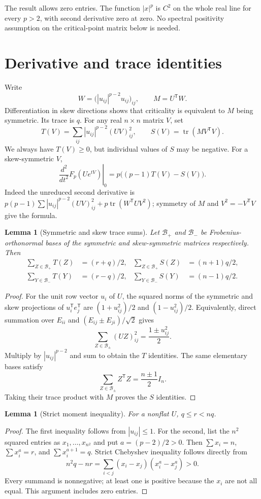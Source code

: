 \documentclass[11pt]{article}
\newtheorem{lemma}[theorem]{Lemma}
\newcommand{\tr}{\operatorname{tr}}
\begin{document}
The result allows zero entries. The function $|x|^p$ is $C^2$ on the
whole real line for every $p>2$, with second derivative zero at zero.
No spectral positivity assumption on the critical-point matrix below
is needed.

\section{Derivative and trace identities}
Write
\[
 W=\bigl(|u_{ij}|^{p-2}u_{ij}\bigr)_{ij},\qquad M=U^{\mathsf T}W.
\]
Differentiation in skew directions shows that criticality is equivalent
to $M$ being symmetric. Its trace is $q$.
For any real $n\times n$ matrix $V$, set
\[
 T(V)=\sum_{ij}|u_{ij}|^{p-2}(UV)_{ij}^2,\qquad
 S(V)=\tr(M V^{\mathsf T}V).
\]
We always have $T(V)\ge0$, but individual values of $S$ may be negative.
For a skew-symmetric $V$,
\begin{equation}\label{eq:hessian}
 \left.\frac{d^2}{dt^2}F_p(Ue^{tV})\right|_0
 =p\bigl((p-1)T(V)-S(V)\bigr).
\end{equation}
Indeed the unreduced second derivative is
$p(p-1)\sum |u_{ij}|^{p-2}(UV)_{ij}^2+
p\tr(W^{\mathsf T}UV^2)$; symmetry of $M$ and
$V^2=-V^{\mathsf T}V$ give the formula.

\begin{lemma}[Symmetric and skew trace sums]\label{lem:traces}
Let $\mathcal B_+$ and $\mathcal B_-$ be Frobenius-orthonormal bases
of the symmetric and skew-symmetric matrices respectively. Then
\begin{align*}
 \sum_{Z\in\mathcal B_+}T(Z)&=(r+q)/2,&
 \sum_{Z\in\mathcal B_+}S(Z)&=(n+1)q/2,\\
 \sum_{Y\in\mathcal B_-}T(Y)&=(r-q)/2,&
 \sum_{Y\in\mathcal B_-}S(Y)&=(n-1)q/2.
\end{align*}
\end{lemma}
\begin{proof}
For the unit row vector $u_i$ of $U$, the squared norms of the
symmetric and skew projections of $u_i^{\mathsf T}e_j^{\mathsf T}$
are $(1+u_{ij}^2)/2$ and $(1-u_{ij}^2)/2$. Equivalently, direct
summation over $E_{ii}$ and $(E_{ij}\pm E_{ji})/\sqrt2$ gives
\[
 \sum_{Z\in\mathcal B_\pm}(UZ)_{ij}^2
 =\frac{1\pm u_{ij}^2}{2}.
\]
Multiply by $|u_{ij}|^{p-2}$ and sum to obtain the $T$ identities.
The same elementary bases satisfy
\[
 \sum_{Z\in\mathcal B_\pm}Z^{\mathsf T}Z
 =\frac{n\pm1}{2}I_n.
\]
Taking their trace product with $M$ proves the $S$ identities.
\end{proof}

\begin{lemma}[Strict moment inequality]\label{lem:cheb}
For a nonflat $U$, $q\le r<nq$.
\end{lemma}
\begin{proof}
The first inequality follows from $|u_{ij}|\le1$. For the second,
list the $n^2$ squared entries as $x_1,\ldots,x_{n^2}$ and put
$a=(p-2)/2>0$. Then $\sum x_i=n$, $\sum x_i^a=r$, and
$\sum x_i^{a+1}=q$. Strict Chebyshev inequality follows directly from
\[
 n^2q-nr
 =\sum_{i<j}(x_i-x_j)(x_i^a-x_j^a)>0.
\]
Every summand is nonnegative; at least one is positive because the
$x_i$ are not all equal. This argument includes zero entries.
\end{proof}
\end{document}
